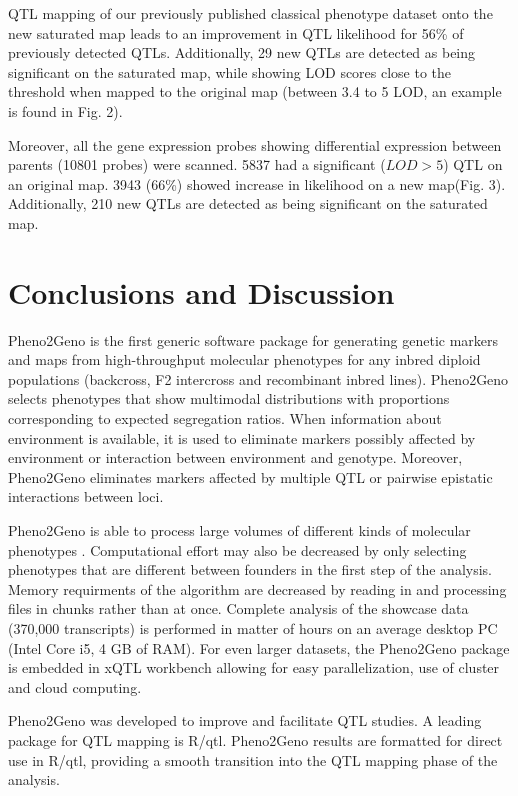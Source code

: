 QTL mapping of our previously published classical phenotype dataset \cite{Joosen:2011} onto the 
new saturated map leads to an improvement in QTL likelihood for 56\% of previously detected QTLs. 
Additionally, 29 new QTLs are detected as being significant on the saturated map, while showing 
LOD scores close to the threshold when mapped to the original map (between 3.4 to 5 LOD, an 
example is found in Fig. 2).

Moreover, all the gene expression probes showing differential expression between parents (10801 
probes) were scanned. 5837 had a significant ($LOD > 5$) QTL on an original map. 3943 (66\%) 
showed increase in likelihood on a new map(Fig. 3). Additionally, 210 new QTLs are detected as 
being significant on the saturated map.
  
\section{Conclusions and Discussion}
Pheno2Geno is the first generic software package for generating genetic markers and maps from 
high-throughput molecular phenotypes for any inbred diploid populations (backcross, F2 intercross 
and recombinant inbred lines). Pheno2Geno selects phenotypes that show multimodal distributions 
with proportions corresponding to expected segregation ratios. When information about environment 
is available, it is used to eliminate markers possibly affected by environment or interaction 
between environment and genotype. Moreover, Pheno2Geno eliminates markers affected by multiple 
QTL or pairwise epistatic interactions between loci.

Pheno2Geno is able to process large volumes of different kinds of molecular phenotypes 
\cite{Trelles:2011}. Computational effort may also be decreased by only selecting phenotypes 
that are different between founders in the first step of the analysis. Memory requirments of the 
algorithm are decreased by reading in and processing files in chunks rather than at once. 
Complete analysis of the showcase data (370,000 transcripts) is performed in matter of hours 
on an average desktop PC (Intel Core i5, 4 GB of RAM). For even larger datasets, the Pheno2Geno 
package is embedded in xQTL workbench \cite{Arends:2012a, Snoek:2012} allowing for easy 
parallelization, use of cluster and cloud computing.\newline

Pheno2Geno was developed to improve and facilitate QTL studies. A leading package for QTL mapping 
is R/qtl. Pheno2Geno results are formatted for direct use in R/qtl, providing a smooth transition 
into the QTL mapping phase of the analysis. \newline

